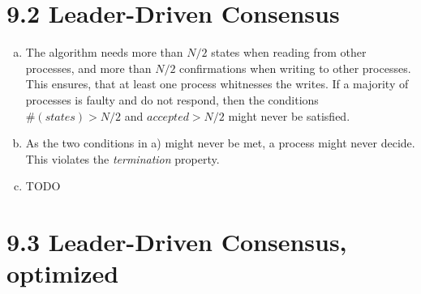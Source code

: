 \documentclass{article}
\begin{document}
    \section*{9.2 Leader-Driven Consensus}
    \begin{enumerate}[a)]
        \item The algorithm needs more than $N/2$ states when reading from other processes, and more than $N/2$ confirmations when writing to other processes.
        This ensures, that at least one process whitnesses the writes. If a majority of processes is faulty and do not respond, then the conditions $\#(states) > N/2$ and $accepted > N/2$ might never be satisfied.
        \item As the two conditions in a) might never be met, a process might never decide. This violates the \textit{termination} property.
        \item TODO
    \end{enumerate}

    \section*{9.3 Leader-Driven Consensus, optimized}
    
    
\end{document}
